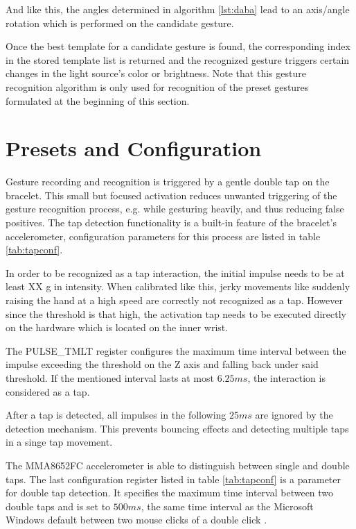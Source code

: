 And like this, the angles determined in algorithm \ref{lst:daba} lead to an axis/angle rotation which is performed on the candidate gesture.

Once the best template for a candidate gesture is found, the corresponding index in the stored template list is returned and the recognized gesture triggers certain changes in the light source's color or brightness. Note that this gesture recognition algorithm is only used for recognition of the preset gestures formulated at the beginning of this section.


\section{Presets and Configuration}
\label{sec:config}
Gesture recording and recognition is triggered by a gentle double tap on the bracelet. This small but focused activation reduces unwanted triggering of the gesture recognition process, e.g. while gesturing heavily, and thus reducing false positives. The tap detection functionality is a built-in feature of the bracelet's accelerometer, configuration parameters for this process are listed in table \ref{tab:tapconf}.

In order to be recognized as a tap interaction, the initial impulse needs to be at least XX g in intensity. When calibrated like this, jerky movements like suddenly raising the hand at a high speed are correctly not recognized as a tap. However since the threshold is that high, the activation tap needs to be executed directly on the hardware which is located on the inner wrist.

The PULSE\_TMLT register configures the maximum time interval between the  impulse exceeding the threshold on the Z axis and falling back under said threshold. If the mentioned interval lasts at most $6.25 ms$, the interaction is considered as a tap.

After a tap is detected, all impulses in the following $25ms$ are ignored by the detection mechanism. This prevents bouncing effects and detecting multiple taps in a singe tap movement.

The MMA8652FC accelerometer is able to distinguish between single and double taps. The last configuration register listed in table \ref{tab:tapconf} is a parameter for double tap detection. It specifies the maximum time interval between two double taps and is set to $500 ms$, the same time interval as the Microsoft Windows default between two mouse clicks of a double click \cite{doubleclick}.

